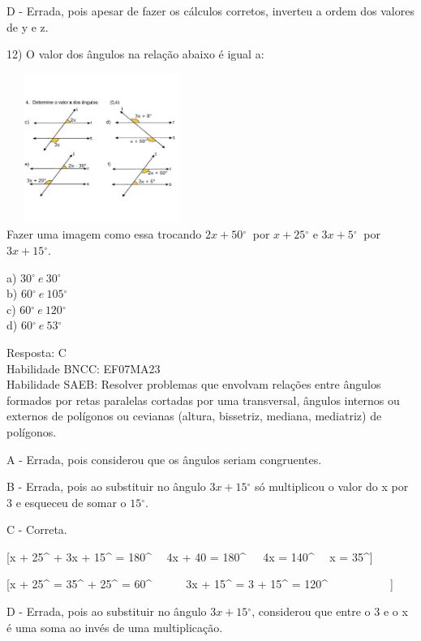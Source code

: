 D - Errada, pois apesar de fazer os cálculos corretos, inverteu a ordem
dos valores de y e z.

12) O valor dos ângulos na relação abaixo é igual a:

\includegraphics[width=2.44792in,height=1.91667in]{./imgSAEB_7_MAT/media/image110.jpg}\\
Fazer uma imagem como essa trocando \(2x + 50{^\circ}\ \) por
\(x + 25{^\circ}\) e \(3x + 5{^\circ}\ \) por \(3x + 15{^\circ}\).

a) \(30{^\circ}\ e\ 30{^\circ}\)\\
b) \(60{^\circ}\ e\ 105{^\circ}\)\\
c) \(60{^\circ}\ e\ 120{^\circ}\)\\
d) \(60{^\circ}\ e\ 53{^\circ}\)

Resposta: C\\
Habilidade BNCC: EF07MA23\\
Habilidade SAEB: Resolver problemas que envolvam relações entre ângulos
formados por retas paralelas cortadas por uma transversal, ângulos
internos ou externos de polígonos ou cevianas (altura, bissetriz,
mediana, mediatriz) de polígonos.

A - Errada, pois considerou que os ângulos seriam congruentes.

B - Errada, pois ao substituir no ângulo \(3x + 15{^\circ}\) só
multiplicou o valor do x por 3 e esqueceu de somar o \(15{^\circ}\).

C - Correta.

[x + 25{^\circ} + 3x + 15{^\circ} = 180{^\circ} \rightarrow \ \ 4x + 40 = 180{^\circ}\  \rightarrow \ \ 4x = 140{^\circ} \rightarrow \ \ x = 35{^\circ}]

[x + 25{^\circ} = 35{^\circ} + 25{^\circ} = 60{^\circ}\ \ \ \ \ \ 3x + 15{^\circ} = 3  + 15{^\circ} = 120{^\circ}\ \ \ \ \ \ \ \ \ \ \ ]

D - Errada, pois ao substituir no ângulo \(3x + 15{^\circ}\), considerou
que entre o 3 e o x é uma soma ao invés de uma multiplicação.

